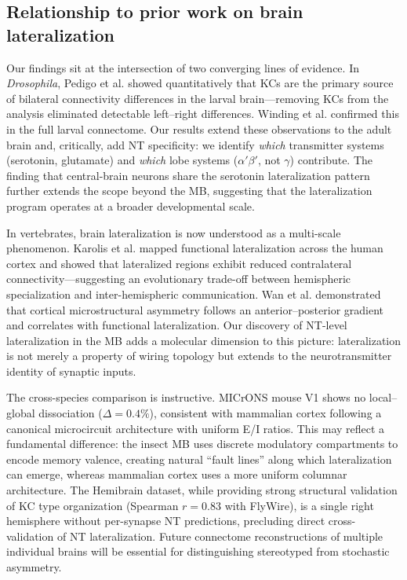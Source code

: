 \documentclass[10pt]{article}
\begin{document}
\subsection*{Relationship to prior work on brain lateralization}

Our findings sit at the intersection of two converging lines of evidence. In \textit{Drosophila}, Pedigo et al.\cite{pedigo2023bilateral_elife} showed quantitatively that KCs are the primary source of bilateral connectivity differences in the larval brain---removing KCs from the analysis eliminated detectable left--right differences. Winding et al.\cite{winding2023larva} confirmed this in the full larval connectome. Our results extend these observations to the adult brain and, critically, add NT specificity: we identify \textit{which} transmitter systems (serotonin, glutamate) and \textit{which} lobe systems ($\alpha'\beta'$, not $\gamma$) contribute. The finding that central-brain neurons share the serotonin lateralization pattern further extends the scope beyond the MB, suggesting that the lateralization program operates at a broader developmental scale.

In vertebrates, brain lateralization is now understood as a multi-scale phenomenon. Karolis et al.\cite{karolis2019lateralisation} mapped functional lateralization across the human cortex and showed that lateralized regions exhibit reduced contralateral connectivity---suggesting an evolutionary trade-off between hemispheric specialization and inter-hemispheric communication. Wan et al.\cite{wan2024microstructural} demonstrated that cortical microstructural asymmetry follows an anterior--posterior gradient and correlates with functional lateralization. Our discovery of NT-level lateralization in the MB adds a molecular dimension to this picture: lateralization is not merely a property of wiring topology but extends to the neurotransmitter identity of synaptic inputs.

The cross-species comparison is instructive. MICrONS mouse V1 shows no local--global dissociation ($\Delta = 0.4\%$), consistent with mammalian cortex following a canonical microcircuit architecture with uniform E/I ratios\cite{microns2021cortical}. This may reflect a fundamental difference: the insect MB uses discrete modulatory compartments to encode memory valence\cite{aso2014mushroom}, creating natural ``fault lines'' along which lateralization can emerge, whereas mammalian cortex uses a more uniform columnar architecture. The Hemibrain dataset, while providing strong structural validation of KC type organization (Spearman $r = 0.83$ with FlyWire), is a single right hemisphere without per-synapse NT predictions, precluding direct cross-validation of NT lateralization. Future connectome reconstructions of multiple individual brains will be essential for distinguishing stereotyped from stochastic asymmetry.
\end{document}
